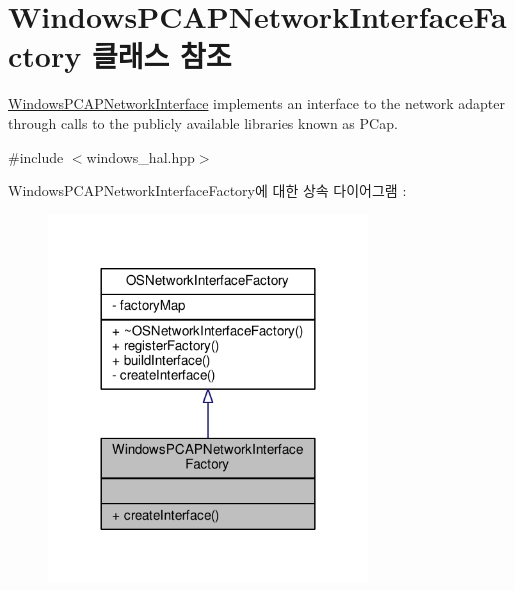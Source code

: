 \hypertarget{class_windows_p_c_a_p_network_interface_factory}{}\section{Windows\+P\+C\+A\+P\+Network\+Interface\+Factory 클래스 참조}
\label{class_windows_p_c_a_p_network_interface_factory}


\hyperlink{class_windows_p_c_a_p_network_interface}{Windows\+P\+C\+A\+P\+Network\+Interface} implements an interface to the network adapter through calls to the publicly available libraries known as P\+Cap.  




{\ttfamily \#include $<$windows\+\_\+hal.\+hpp$>$}



Windows\+P\+C\+A\+P\+Network\+Interface\+Factory에 대한 상속 다이어그램 \+: 
\nopagebreak
\begin{figure}[H]
\begin{center}
\leavevmode
\includegraphics[width=240pt]{class_windows_p_c_a_p_network_interface_factory__inherit__graph}
\end{center}
\end{figure}



